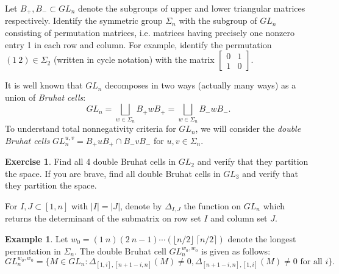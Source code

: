 \documentclass{amsart}
\theoremstyle{definition}
\newtheorem{example}[theorem]{Example}
\newtheorem{exercise}[theorem]{Exercise}
\theoremstyle{remark}
\numberwithin{equation}{section}
\begin{document}
    Let $B_+,B_-\subset GL_n$ denote the subgroups of upper and lower triangular matrices respectively.  Identify the symmetric group $\Sigma_n$ with the subgroup of $GL_n$ consisting of permutation matrices, i.e. matrices having precisely one nonzero entry 1 in each row and column.  For example, identify the permutation $(1\ 2)\in\Sigma_2$ (written in cycle notation) with the matrix $\left[\begin{array}{cc}0 & 1\\ 1 & 0\end{array}\right]$.  

    It is well known that $GL_n$ decomposes in two ways (actually many ways) as a union of \emph{Bruhat cells}:
    \[GL_n=\bigsqcup_{w\in\Sigma_n}B_+w B_+=\bigsqcup_{w\in\Sigma_n}B_-w B_-.\]
    To understand total nonnegativity criteria for $GL_n$, we will consider the \emph{double Bruhat cells} $GL_n^{u,v}=B_+uB_+\cap B_-vB_-$ for $u,v\in\Sigma_n$.  
    \setcounter{subexercise}{2}
    \begin{exercise}
      Find all 4 double Bruhat cells in $GL_2$ and verify that they partition the space.  If you are brave, find all double Bruhat cells in $GL_3$ and verify that they partition the space.
    \end{exercise}
    For $I,J\subset[1,n]$ with $|I|=|J|$, denote by $\Delta_{I,J}$ the function on $GL_n$ which returns the determinant of the submatrix on row set $I$ and column set $J$.
    \setcounter{subexample}{1}
    \begin{example}\label{example:big cell}
      Let $w_0=(1\ n)(2\ n-1)\cdots(\lfloor n/2\rfloor\ \lceil n/2\rceil)$ denote the longest permutation in $\Sigma_n$.  The double Bruhat cell $GL_n^{w_0,w_0}$ is given as follows:
      \[GL_n^{w_0,w_0}=\{M\in GL_n:\Delta_{[1,i],[n+1-i,n]}(M)\ne0,\Delta_{[n+1-i,n],[1,i]}(M)\ne0\text{ for all $i$}\}.\]
    \end{example}
\end{document}
